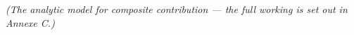 \textit{(The analytic model for composite contribution --- the full working is set out in Annexe C.)}

% 
% 
% 
% 
% 
% 
% 
